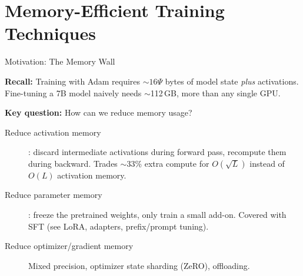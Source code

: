 
\section{Memory-Efficient Training Techniques}
\label{sec:memory_tricks}

\begin{frame}{Motivation: The Memory Wall}

  \textbf{Recall:} Training with Adam requires $\sim 16\Psi$ bytes of model state \emph{plus} activations.
  Fine-tuning a 7B model naively needs $\sim$112\,GB, more than any single GPU.

  \vspace{0.5em}
  \textbf{Key question:} How can we reduce memory usage?

  \vspace{0.3em}
  \begin{description}
    \item[Reduce activation memory] : discard intermediate activations during forward pass, recompute them during backward. Trades $\sim$33\% extra compute for $O(\sqrt{L})$ instead of $O(L)$ activation memory.
    \item[Reduce parameter memory] : freeze the pretrained weights, only train a small add-on. Covered with SFT (see LoRA, adapters, prefix/prompt tuning).
    \item[Reduce optimizer/gradient memory] Mixed precision, optimizer state sharding (ZeRO), offloading.
  \end{description}
\end{frame}

